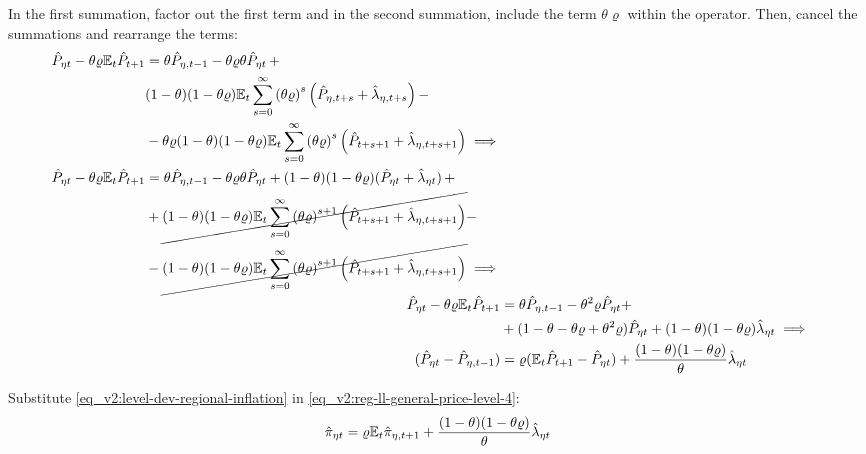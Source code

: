 \documentclass[../thesis.tex]{subfiles}
\begin{document}
In the first summation, factor out the first term and in the second summation, include the term $\theta \varrho$ within the operator. Then, cancel the summations and rearrange the terms:
\begin{align}
	\begin{split}
		\hat{P}_{\eta t} - \theta \varrho {\mathbb{E}_{t}} \hat{P}_{t+1} &= \theta \hat{P}_{\eta, t-1} - \theta \varrho \theta \hat{P}_{\eta t} \, + \\
		& (1-\theta) (1- \theta \varrho) {\mathbb{E}_{t}} \sum_{s=0}^{\infty} \left( \theta \varrho \right)^s \left( \hat{P}_{\eta, t+s} + \hat{\lambda}_{\eta, t+s} \right) -
		\\
		& - \theta \varrho (1-\theta) (1- \theta \varrho) {\mathbb{E}_{t}} \sum_{s=0}^{\infty} \left( \theta \varrho \right)^s \left( \hat{P}_{t+s+1} + \hat{\lambda}_{\eta, t+s+1} \right) \implies \nonumber 
	\end{split} \\
	\begin{split}
		\hat{P}_{\eta t} - \theta \varrho {\mathbb{E}_{t}} \hat{P}_{t+1} &= \theta \hat{P}_{\eta, t-1} - \theta \varrho \theta \hat{P}_{\eta t} + (1-\theta) (1- \theta \varrho) (\hat{P}_{\eta t} + \hat{\lambda}_{\eta t}) \, + 
		\\
		& + \cancel{(1-\theta) (1- \theta \varrho) {\mathbb{E}_{t}} \sum_{s=0}^{\infty} \left( \theta \varrho \right)^{s+1} \left( \hat{P}_{t+s+1} + \hat{\lambda}_{\eta, t+s+1} \right)} -
		\\
		& - \cancel{(1-\theta) (1- \theta \varrho) {\mathbb{E}_{t}} \sum_{s=0}^{\infty} \left( \theta \varrho \right)^{s+1} \left( \hat{P}_{t+s+1} + \hat{\lambda}_{\eta, t+s+1} \right)} \implies \nonumber 
	\end{split} \\
	\hat{P}_{\eta t} - \theta \varrho {\mathbb{E}_{t}} \hat{P}_{t+1} &= \theta \hat{P}_{\eta, t-1} - \theta^2 \varrho \hat{P}_{\eta t} + \nonumber \\
	& + (1- \theta -\theta \varrho + \theta^2 \varrho) \hat{P}_{\eta t} + (1-\theta) (1- \theta \varrho) \hat{\lambda}_{\eta t} \implies \nonumber \\
	(\hat{P}_{\eta t} - \hat{P}_{\eta, t-1}) &= \varrho ({\mathbb{E}_{t}} \hat{P}_{t+1} - \hat{P}_{\eta t}) + \frac{(1-\theta) (1- \theta \varrho)}{\theta} \hat{\lambda}_{\eta t}
	\label{eq_v2:reg-ll-general-price-level-4}
\end{align}

Substitute \ref{eq_v2:level-dev-regional-inflation} in \ref{eq_v2:reg-ll-general-price-level-4}:
\begin{align}
	\hat{\pi}_{\eta t} = \varrho {\mathbb{E}_{t}} \hat{\pi}_{\eta, t+1} + \frac{(1-\theta) (1- \theta \varrho)}{\theta} \hat{\lambda}_{\eta t} \label{eq_v2:reg-nk-phillips-curve-mc}
\end{align}
\end{document}
